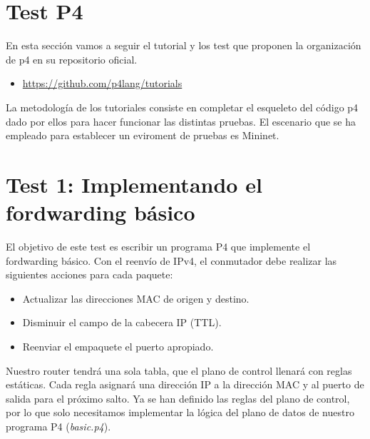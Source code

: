 \section{Test P4}
En esta sección vamos a seguir el tutorial y los test que proponen la organización de p4 en su repositorio oficial.
\begin{itemize}
    \item \url{https://github.com/p4lang/tutorials}
\end{itemize}
La metodología de los tutoriales consiste en completar el esqueleto del código p4 dado por ellos para hacer funcionar las distintas pruebas. El escenario que se ha empleado para establecer un eviroment de pruebas es Mininet.

\section{Test 1: Implementando el fordwarding básico}

El objetivo de este test es escribir un programa P4 que implemente el fordwarding básico. Con el reenvío de IPv4, el conmutador debe realizar las siguientes acciones para cada paquete:
\begin{itemize}
    \item Actualizar las direcciones MAC de origen y destino.
    \item Disminuir el campo de la cabecera IP (TTL).
    \item Reenviar el empaquete el puerto apropiado.
\end{itemize}

Nuestro router tendrá una sola tabla, que el plano de control llenará con reglas estáticas. Cada regla asignará una dirección IP a la dirección MAC y al puerto de salida para el próximo salto. Ya se han definido las reglas del plano de control, por lo que solo necesitamos implementar la lógica del plano de datos de nuestro programa P4 (\textit{basic.p4}).

